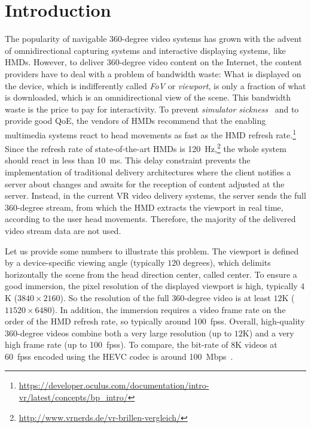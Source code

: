 \section{Introduction}
\label{sec:introduction}

The popularity of navigable 360-degree video systems has grown with
the advent of omnidirectional capturing systems
and interactive displaying systems, like \acp{HMD}. However, to
deliver 360-degree video content on the Internet, the content
providers have to deal with a problem of bandwidth waste: What is
displayed on the device, which is indifferently called
\textit{\ac{FoV}} or \textit{viewport}, is only a fraction of what is
downloaded, which is an omnidirectional view of the scene.
This bandwidth waste is the price to pay for interactivity. To prevent
\emph{simulator sickness}~\cite{moss2011characteristics} and to
provide good \ac{QoE}, the vendors of \acp{HMD} recommend that the
enabling multimedia systems react to head movements as fast as the
\ac{HMD} refresh rate.\footnote{
\url{https://developer.oculus.com/documentation/intro-vr/latest/concepts/bp_intro/}}
Since the refresh rate of state-of-the-art \acp{HMD} is
\SI{120}{\hertz},\footnote{\url{http://www.vrnerds.de/vr-brillen-vergleich/}}
the whole
system should react in less than \SI{10}{ms}. This delay constraint
prevents the implementation of traditional delivery architectures
where the client notifies a server about changes and awaits for the
reception of content adjusted at the server. Instead, in the current
\ac{VR} video delivery systems, the server sends the full $360$-degree
stream, from which the \ac{HMD} extracts the viewport in real time,
according to the user head movements. Therefore, the majority of the
delivered video stream data are not used.

Let us provide some numbers to illustrate this problem. The viewport
is defined by a device-specific viewing angle (typically
$120$ degrees), which delimits horizontally the scene from the head direction center, called \FoV{} center. To ensure a
good immersion, the pixel resolution of the displayed viewport is high,
typically $4$K ($3840\times2160$). So the
resolution of the full $360$-degree video is at least $12$K
($11520\times6480$). In addition, the immersion requires a video frame
rate on the order of the \ac{HMD} refresh rate, so typically around
\SI[mode=text]{100}{\acp{fps}}. Overall, high-quality $360$-degree
videos combine both a very large resolution (up to $12$K) and a very
high frame rate (up to \SI[mode=text]{100}{\acp{fps}}). To compare,
the bit-rate of 8K videos at \SI[mode=text]{60}{\acp{fps}} encoded
using the \ac{HEVC} codec is around \SI{100}{Mbps}~\cite{7398367}.

